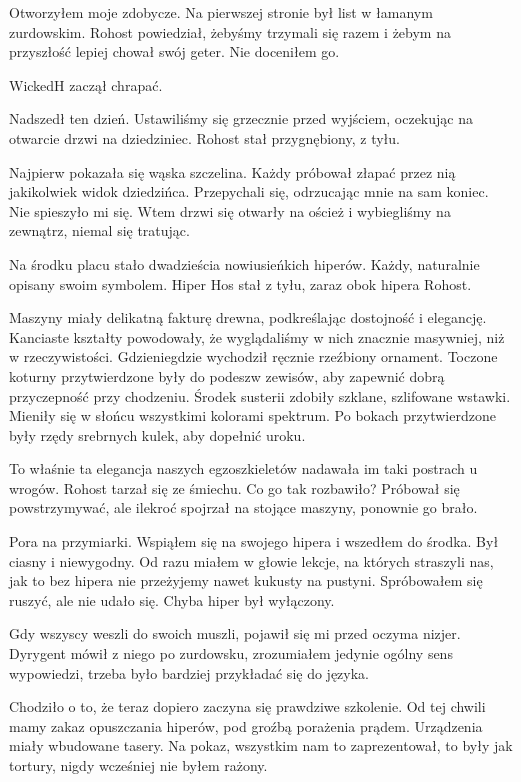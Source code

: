 Otworzyłem moje zdobycze. 
Na pierwszej stronie był list w łamanym zurdowskim.
Rohost powiedział, żebyśmy trzymali się razem i żebym na przyszłość lepiej chował swój geter.
Nie doceniłem go.

\divider{}

WickedH zaczął chrapać.

\divider{}

Nadszedł ten dzień.
Ustawiliśmy się grzecznie przed wyjściem, oczekując na otwarcie drzwi na dziedziniec.
Rohost stał przygnębiony, z tyłu.

Najpierw pokazała się wąska szczelina.
Każdy próbował złapać przez nią jakikolwiek widok dziedzińca.
Przepychali się, odrzucając mnie na sam koniec. Nie spieszyło mi się.
Wtem drzwi się otwarły na oścież i wybiegliśmy na zewnątrz, niemal się tratując.

Na środku placu stało dwadzieścia nowiusieńkich hiperów.
Każdy, naturalnie opisany swoim symbolem.
Hiper Hos stał z tyłu, zaraz obok hipera Rohost.

Maszyny miały delikatną fakturę drewna, podkreślając dostojność i elegancję.
Kanciaste kształty powodowały, że wyglądaliśmy w nich znacznie masywniej, niż w rzeczywistości.
Gdzieniegdzie wychodził ręcznie rzeźbiony ornament.
Toczone koturny przytwierdzone były do podeszw zewisów, aby zapewnić dobrą przyczepność przy chodzeniu.
Środek susterii zdobiły szklane, szlifowane wstawki. Mieniły się w słońcu wszystkimi kolorami spektrum.
Po bokach przytwierdzone były rzędy srebrnych kulek, aby dopełnić uroku.

To właśnie ta elegancja naszych egzoszkieletów nadawała im taki postrach u wrogów.
Rohost tarzał się ze śmiechu. Co go tak rozbawiło?
Próbował się powstrzymywać, ale ilekroć spojrzał na stojące maszyny, ponownie go brało.

Pora na przymiarki.
Wspiąłem się na swojego hipera i wszedłem do środka.
Był ciasny i niewygodny.
Od razu miałem w głowie lekcje, na których straszyli nas, jak to bez hipera nie przeżyjemy nawet kukusty na pustyni.
Spróbowałem się ruszyć, ale nie udało się.
Chyba hiper był wyłączony.

Gdy wszyscy weszli do swoich muszli, pojawił się mi przed oczyma nizjer.
Dyrygent mówił z niego po zurdowsku, zrozumiałem jedynie ogólny sens wypowiedzi, trzeba było bardziej przykładać się do języka.

Chodziło o to, że teraz dopiero zaczyna się prawdziwe szkolenie.
Od tej chwili mamy zakaz opuszczania hiperów, pod groźbą porażenia prądem.
Urządzenia miały wbudowane tasery.
Na pokaz, wszystkim nam to zaprezentował, to były jak tortury, nigdy wcześniej nie byłem rażony.

